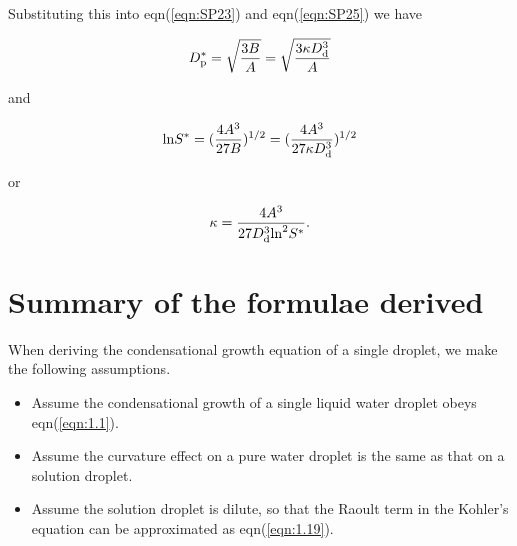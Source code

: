 \documentclass[12pt]{article}
\begin{document}
Substituting this into eqn(\ref{eqn:SP23}) and eqn(\ref{eqn:SP25})
we have 

\begin{equation}\label{eqn:3.24}
D_{\rm p}^{*}=\sqrt{\frac{3B}{A}}=\sqrt{\frac{3 \kappa D_{\rm d}^{3}}{A}}
\end{equation}

and

\begin{equation}\label{eqn:3.25}
{\rm ln}  S^{*}=(\frac{4A^{3}}{27B})^{1/2}=(\frac{4A^{3}}{27\kappa D_{\rm d}^{3} })^{1/2}
\end{equation}

or 

\begin{equation}\label{eqn:3.26}
\kappa=\frac{4A^{3}} {27D_{\rm d}^{3} {\rm ln}^{2} S^{*} }.
\end{equation}


\section{Summary of the formulae derived}

When deriving the condensational growth equation of a single droplet, we make the following assumptions.
\begin{itemize}
\item Assume the condensational growth of a single liquid water droplet obeys eqn(\ref{eqn:1.1}).
\item Assume the curvature effect on a pure water droplet is the same as that on a solution droplet.
\item Assume the solution droplet is dilute, so that the Raoult term in the Kohler's equation can be approximated as eqn(\ref{eqn:1.19}).
\end{itemize}
\end{document}
